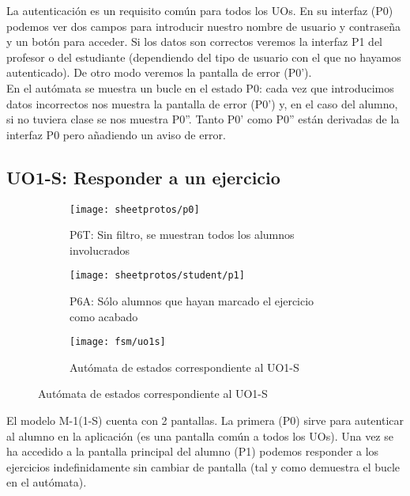 La autenticación es un requisito común para todos los UOs. En su interfaz (P0) podemos ver dos campos para introducir nuestro nombre de usuario y contraseña y un botón para acceder. Si los datos son correctos veremos la interfaz P1 del profesor o del estudiante (dependiendo del tipo de usuario con el que no hayamos autenticado). De otro modo veremos la pantalla de error (P0').\\

En el autómata se muestra un bucle en el estado P0: cada vez que introducimos datos incorrectos nos muestra la pantalla de error (P0') y, en el caso del alumno, si no tuviera clase se nos muestra P0''. Tanto P0' como P0'' están derivadas de la interfaz P0 pero añadiendo un aviso de error.\\

\subsection{UO1-S: Responder a un ejercicio}
\label{analisis-de-requisitos:funcionales:uo1s}

\begin{figure}[H]
\begin{subfigure}[b]{0.5\textwidth}
	\centering
	\texttt{[image: sheetprotos/p0]}
	\caption{P6T: Sin filtro, se muestran todos los alumnos involucrados}
	\label{fig:files-css}
\end{subfigure}
%
\begin{subfigure}[b]{0.5\textwidth}
	\centering
	\texttt{[image: sheetprotos/student/p1]}
	\caption{P6A: Sólo alumnos que hayan marcado el ejercicio como acabado}
	\label{fig:files-js}
\end{subfigure}

\begin{subfigure}[b]{\textwidth}
	\centering
	\texttt{[image: fsm/uo1s]}
	\caption{Autómata de estados correspondiente al UO1-S}
	\label{fig:fsm-uo1s}
\end{subfigure}

\label{fig:uo1s}
\end{figure}

El modelo M-1(1-S) cuenta con 2 pantallas. La primera (P0) sirve para autenticar al alumno en la aplicación (es una pantalla común a todos los UOs). Una vez se ha accedido a la pantalla principal del alumno (P1) podemos responder a los ejercicios indefinidamente sin cambiar de pantalla (tal y como demuestra el bucle en el autómata).\\

